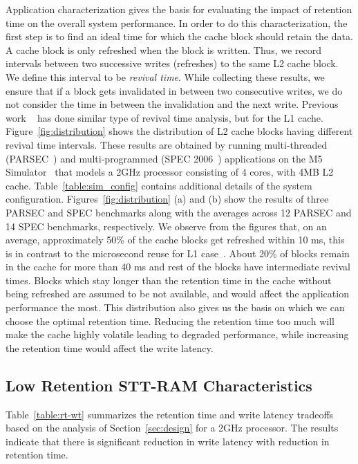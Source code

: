 Application characterization gives the basis for evaluating the impact of retention time on the overall system performance. In order to do this characterization, the first step is to  find an ideal time for which the cache block should retain the data.  A cache block is only refreshed when the block is written. Thus, we record intervals between two successive writes (refreshes) to the same L2 cache block. We define this interval to be {\it revival time}.
While collecting these results, we ensure that if a block gets invalidated in between two consecutive writes,
we do not consider the time in between the invalidation and the next write.
Previous work ~\cite{3t1d-cache} has done similar type of revival time analysis, but for the L1 cache. Figure~\ref{fig:distribution} shows the distribution of L2 cache blocks having different revival time intervals. These results are obtained by running multi-threaded (PARSEC~\cite{PARSEC}) and multi-programmed (SPEC 2006~\cite{SPEC}) applications on the M5 Simulator~\cite{M5} that models a 2GHz processor consisting of 4 cores, with 4MB L2 cache. Table~\ref{table:sim_config} contains additional details of the system configuration.
Figures~\ref{fig:distribution} (a) and (b) show the results of three PARSEC and SPEC benchmarks along with the averages
across 12 PARSEC  and 14 SPEC benchmarks, respectively. We observe from the figures that, on an average,
approximately 50\% of the cache blocks get refreshed within 10 ms, this is in contrast to the microsecond
reuse for L1 case~\cite{3t1d-cache}. About 20\% of blocks remain in the cache for more than 40 ms and rest of the blocks
have intermediate revival times. Blocks which stay longer than the retention time in the cache without being refreshed
are assumed to be not available, and would affect the application performance the most.
This distribution also gives us the basis on which we can choose the optimal retention time.
Reducing the retention time too much will make the cache highly volatile leading to degraded performance,
while increasing the retention time would affect the write latency.



\subsection{Low Retention STT-RAM Characteristics}
Table~\ref{table:rt-wt} summarizes the retention time and write latency tradeoffs based on the analysis of Section~\ref{sec:design}
for a 2GHz processor.
The results indicate that there is significant reduction in write latency with reduction in retention time.

